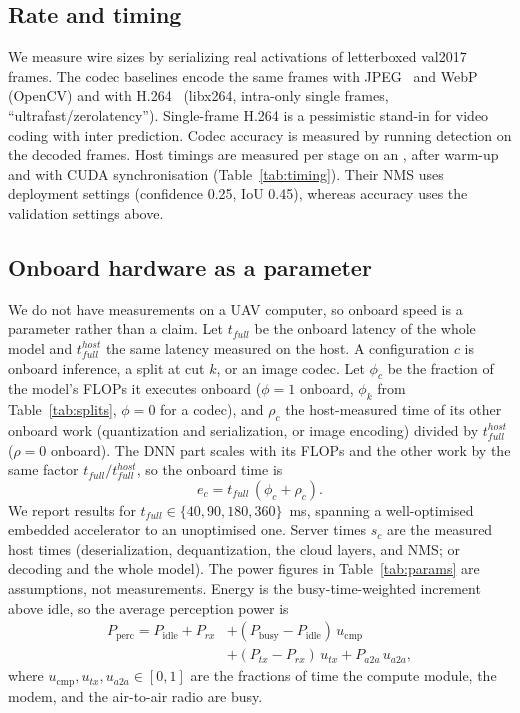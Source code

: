 \documentclass[journal,twocolumn,10pt]{IEEEtran}
\begin{document}
\subsection{Rate and timing}
We measure wire sizes by serializing real activations of \TimingImages{} letterboxed val2017 frames. The codec baselines encode the same frames with JPEG~\cite{wallace1992jpeg} and WebP (OpenCV) and with H.264~\cite{wiegand2003h264} (libx264, intra-only single frames, ``ultrafast/zerolatency''). Single-frame H.264 is a pessimistic stand-in for video coding with inter prediction. Codec accuracy is measured by running detection on the decoded frames. Host timings are measured per stage on an \HostGPU{}, after warm-up and with CUDA synchronisation (Table~\ref{tab:timing}). Their NMS uses deployment settings (confidence 0.25, IoU 0.45), whereas accuracy uses the validation settings above.

\subsection{Onboard hardware as a parameter}\label{sec:model-hw}
We do not have measurements on a UAV computer, so onboard speed is a parameter rather than a claim. Let $t_{full}$ be the onboard latency of the whole model and $t^{host}_{full}$ the same latency measured on the host. A configuration $c$ is onboard inference, a split at cut $k$, or an image codec. Let $\phi_c$ be the fraction of the model's FLOPs it executes onboard ($\phi=1$ onboard, $\phi_k$ from Table~\ref{tab:splits}, $\phi=0$ for a codec), and $\rho_c$ the host-measured time of its other onboard work (quantization and serialization, or image encoding) divided by $t^{host}_{full}$ ($\rho=0$ onboard). The DNN part scales with its FLOPs and the other work by the same factor $t_{full}/t^{host}_{full}$, so the onboard time is
\begin{equation*}
e_c = t_{full}\,(\phi_c+\rho_c).
\end{equation*}
We report results for $t_{full}\in\{40,90,180,360\}$~ms, spanning a well-optimised embedded accelerator to an unoptimised one. Server times $s_c$ are the measured host times (deserialization, dequantization, the cloud layers, and NMS; or decoding and the whole model). The power figures in Table~\ref{tab:params} are assumptions, not measurements. Energy is the busy-time-weighted increment above idle, so the average perception power is
\begin{align*}
P_{\mathrm{perc}} = P_{\mathrm{idle}}+P_{rx} &+ (P_{\mathrm{busy}}-P_{\mathrm{idle}})\,u_{\mathrm{cmp}}\\
&+ (P_{tx}-P_{rx})\,u_{tx}+P_{a2a}\,u_{a2a},
\end{align*}
where $u_{\mathrm{cmp}},u_{tx},u_{a2a}\in[0,1]$ are the fractions of time the compute module, the modem, and the air-to-air radio are busy.
\end{document}

